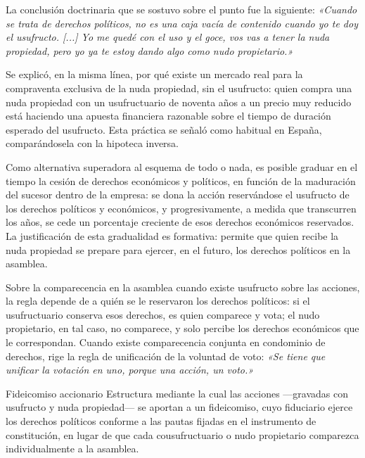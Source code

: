 \documentclass[12pt,oneside]{book}
\begin{document}
La conclusión doctrinaria que se sostuvo sobre el punto fue la siguiente: \textit{«Cuando se trata de derechos políticos, no es una caja vacía de contenido cuando yo te doy el usufructo. [...] Yo me quedé con el uso y el goce, vos vas a tener la nuda propiedad, pero yo ya te estoy dando algo como nudo propietario.»}

Se explicó, en la misma línea, por qué existe un mercado real para la compraventa exclusiva de la nuda propiedad, sin el usufructo: quien compra una nuda propiedad con un usufructuario de noventa años a un precio muy reducido está haciendo una apuesta financiera razonable sobre el tiempo de duración esperado del usufructo. Esta práctica se señaló como habitual en España, comparándosela con la hipoteca inversa.

\begin{note}
Como alternativa superadora al esquema de todo o nada, es posible graduar en el tiempo la cesión de derechos económicos y políticos, en función de la maduración del sucesor dentro de la empresa: se dona la acción reservándose el usufructo de los derechos políticos y económicos, y progresivamente, a medida que transcurren los años, se cede un porcentaje creciente de esos derechos económicos reservados. La justificación de esta gradualidad es formativa: permite que quien recibe la nuda propiedad se prepare para ejercer, en el futuro, los derechos políticos en la asamblea.
\end{note}

Sobre la comparecencia en la asamblea cuando existe usufructo sobre las acciones, la regla depende de a quién se le reservaron los derechos políticos: si el usufructuario conserva esos derechos, es quien comparece y vota; el nudo propietario, en tal caso, no comparece, y solo percibe los derechos económicos que le correspondan. Cuando existe comparecencia conjunta en condominio de derechos, rige la regla de unificación de la voluntad de voto: \textit{«Se tiene que unificar la votación en uno, porque una acción, un voto.»}

\begin{definition}{Fideicomiso accionario}
Estructura mediante la cual las acciones ---gravadas con usufructo y nuda propiedad--- se aportan a un fideicomiso, cuyo fiduciario ejerce los derechos políticos conforme a las pautas fijadas en el instrumento de constitución, en lugar de que cada cousufructuario o nudo propietario comparezca individualmente a la asamblea.
\end{definition}
\end{document}
